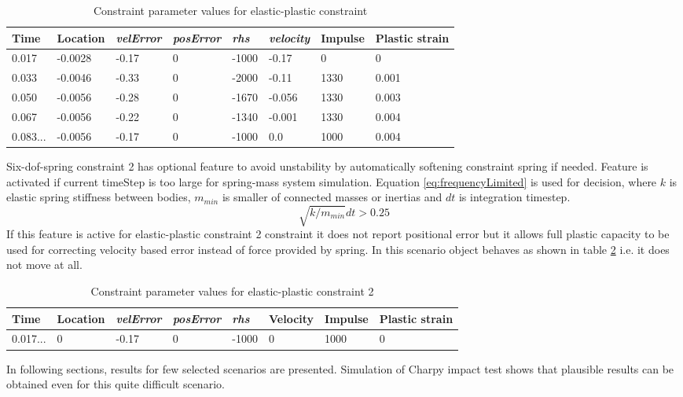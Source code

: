 \begin {table}[htb!]
\begin{center}
\begin{tabular}{|l|l| l| l|l|l|l|l|}
\hline
{\bf Time} & 
{\bf Location} &
{\it velError} & {\it posError} & {\it rhs} &
{\it velocity} & 
{\bf Impulse} & 
{\bf Plastic strain} \\  \hline
0.017 & -0.0028 &-0.17 & 0 & -1000 & -0.17 & 0 & 0 \\  \hline
0.033 & -0.0046 &-0.33 & 0 & -2000 & -0.11 &  1330 & 0.001 \\  \hline
0.050 & -0.0056 &-0.28 & 0 & -1670 & -0.056 &  1330 & 0.003 \\  \hline
0.067 & -0.0056 &-0.22 & 0 & -1340 &  -0.001&  1330 & 0.004\\  \hline
0.083... & -0.0056  & -0.17 & 0 & -1000 &  0.0&  1000 & 0.004\\  \hline
\end {tabular}
\end{center}
\caption {Constraint parameter values for elastic-plastic constraint} \label{tab:epBlockValues} 
\end {table}

Six-dof-spring constraint 2 has optional feature to avoid unstability by automatically softening constraint
spring if needed. Feature is activated if current timeStep is too large for spring-mass system simulation.
Equation \ref{eq:frequencyLimited} is used for decision, where $k$ is elastic spring stiffness between bodies,
$m_{min}$ is smaller of connected masses or inertias and $dt$ is integration timestep.
\begin{equation} \label{eq:frequencyLimited}
\sqrt{ k /  m_{min}} dt > 0.25 
\end{equation}
If this feature is active for elastic-plastic constraint 2 constraint  
it does not report positional error but it allows full plastic capacity to be used for correcting
velocity based error instead of force provided by spring.
In this scenario object behaves as shown in table  \ref{tab:ep2BlockValues} i.e. it does not move at all.

\begin {table}[htb!]
\begin{center}
\begin{tabular}{|l|l| l| l|l|l|l|l|}
\hline
{\bf Time} & 
{\bf Location} &
{\it velError} & {\it posError} & {\it rhs} &
{\bf Velocity} & 
{\bf Impulse} & 
{\bf Plastic strain} \\  \hline
0.017... &  0 & -0.17  & 0 & -1000 & 0       & 1000 & 0 \\  \hline
\end {tabular}
\end{center}
\caption {Constraint parameter values for elastic-plastic constraint 2} \label{tab:ep2BlockValues} 
\end {table}

In following sections, results for few selected scenarios are presented.
Simulation of Charpy impact test shows that plausible results can be obtained even for this quite difficult scenario.

